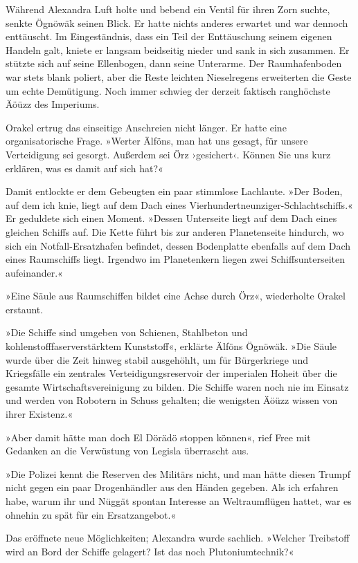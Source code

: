 Während Alexandra Luft holte und bebend ein Ventil für ihren Zorn suchte, senkte Ögnöwäk seinen Blick. Er hatte nichts anderes erwartet und war dennoch enttäuscht. Im Eingeständnis, dass ein Teil der Enttäuschung seinem eigenen Handeln galt, kniete er langsam beidseitig nieder und sank in sich zusammen. Er stützte sich auf seine Ellenbogen, dann seine Unterarme. Der Raumhafenboden war stets blank poliert, aber die Reste leichten Nieselregens erweiterten die Geste um echte Demütigung. Noch immer schwieg der derzeit faktisch ranghöchste Äöüzz des Imperiums.

Orakel ertrug das einseitige Anschreien nicht länger. Er hatte eine organisatorische Frage. »Werter Älföns, man hat uns gesagt, für unsere Verteidigung sei gesorgt. Außerdem sei Örz ›gesichert‹. Können Sie uns kurz erklären, was es damit auf sich hat?«

Damit entlockte er dem Gebeugten ein paar stimmlose Lachlaute. »Der Boden, auf dem ich knie, liegt auf dem Dach eines Vierhundertneunziger-Schlachtschiffs.« Er geduldete sich einen Moment. »Dessen Unterseite liegt auf dem Dach eines gleichen Schiffs auf. Die Kette führt bis zur anderen Planetenseite hindurch, wo sich ein Notfall-Ersatzhafen befindet, dessen Bodenplatte ebenfalls auf dem Dach eines Raumschiffs liegt. Irgendwo im Planetenkern liegen zwei Schiffsunterseiten aufeinander.«

»Eine Säule aus Raumschiffen bildet eine Achse durch Örz«, wiederholte Orakel erstaunt.

»Die Schiffe sind umgeben von Schienen, Stahlbeton und kohlenstofffaserverstärktem Kunststoff«, erklärte Älföns Ögnöwäk. »Die Säule wurde über die Zeit hinweg stabil ausgehöhlt, um für Bürgerkriege und Kriegsfälle ein zentrales Verteidigungsreservoir der imperialen Hoheit über die gesamte Wirtschaftsvereinigung zu bilden. Die Schiffe waren noch nie im Einsatz und werden von Robotern in Schuss gehalten; die wenigsten Äöüzz wissen von ihrer Existenz.«

»Aber damit hätte man doch El Dörädö stoppen können«, rief Free mit Gedanken an die Verwüstung von Legisla überrascht aus.

»Die Polizei kennt die Reserven des Militärs nicht, und man hätte diesen Trumpf nicht gegen ein paar Drogenhändler aus den Händen gegeben. Als ich erfahren habe, warum ihr und Nüggät spontan Interesse an Weltraumflügen hattet, war es ohnehin zu spät für ein Ersatzangebot.«

Das eröffnete neue Möglichkeiten; Alexandra wurde sachlich. »Welcher Treibstoff wird an Bord der Schiffe gelagert? Ist das noch Plutoniumtechnik?«

